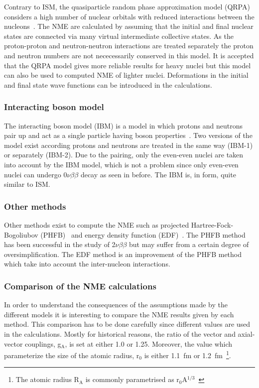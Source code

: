 \documentclass[main.tex]{subfiles}
\begin{document}
\NI Contrary to ISM, the quasiparticle random phase approximation model (QRPA) considers a high number of nuclear orbitals with reduced interactions between the nucleons~\cite{QRPA_1,QRPA_2,QRPA_3}. The NME are calculated by assuming that the initial and final nuclear states are connected via many virtual intermediate collective states. As the proton-proton and neutron-neutron interactions are treated separately the proton and neutron numbers are not nececessarily conserved in this model. It is accepted that the QRPA model gives more reliable results for heavy nuclei but this model can also be used to computed NME of lighter nuclei. Deformations in the initial and final state wave functions can be introduced in the calculations. 


\subsubsection{Interacting boson model}


\NI The interacting boson model (IBM) is a model in which protons and neutrons pair up and act as a single particle having boson properties~\cite{IBM}. Two versions of the model exist according protons and neutrons are treated in the same way (IBM-1) or separately (IBM-2). Due to the pairing, only the even-even nuclei are taken into account by the IBM model, which is not a problem since only even-even nuclei can undergo 0$\nu\beta\beta$ decay as seen in before. The IBM is, in form, quite similar to ISM.


\subsubsection{Other methods}


\NI Other methods exist to compute the NME such as projected Hartree-Fock-Bogoliubov (PHFB)~\cite{PHFB_1,PHFB_2} and energy density function (EDF)~\cite{EDF_1,EDF_2,EDF_3}. The PHFB method has been successful in the study of 2$\nu\beta\beta$ but may suffer from a certain degree of oversimplification. The EDF method is an improvement of the PHFB method which take into account the inter-nucleon interactions.


\subsubsection{Comparison of the NME calculations}


\NI In order to understand the consequences of the assumptions made by the different models it is interesting to compare the NME results given by each method. This comparison has to be done carefully since different values are used in the calculations. Mostly for historical reasons, the ratio of the vector and axial-vector couplings, g$_{\text{A}}$, is set at either 1.0 or 1.25. Moreover, the value which parameterize the size of the atomic radius, r$_0$ is either 1.1~fm or 1.2~fm~\footnote{The atomic radius R$_\text{A}$ is commonly parametrised as r$_0$A$^{\text{1/3}}$~\cite{RadiusNucleus}}.
\end{document}
